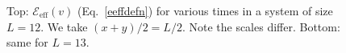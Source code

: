 \documentclass[aps,prx,twocolumn,superscriptaddress,floatfix,nofootinbib,prx]{revtex4}
\renewcommand{\>}{\right\rangle}
\newcommand{\<}{\left\langle}
\newcommand{\lt}{\mathcal{E}}
\begin{document}
\begin{figure}[t]
\caption{Top: $\lt_\text{eff}(v)$ (Eq.~\ref{eeffdefn}) for various times in a system of size $L=12$. We take $(x+y)/2=L/2$. Note the scales differ. Bottom: same for $L=13$.}  
 \label{evpanel}
\end{figure}
\end{document}
